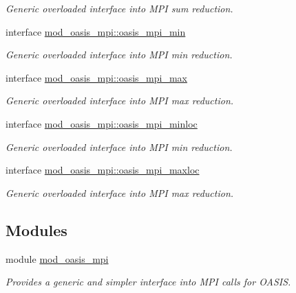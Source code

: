 \begin{DoxyCompactItemize}
\begin{DoxyCompactList}\small\item\em Generic overloaded interface into M\+PI sum reduction. \end{DoxyCompactList}\item 
interface \hyperlink{interfacemod__oasis__mpi_1_1oasis__mpi__min}{mod\+\_\+oasis\+\_\+mpi\+::oasis\+\_\+mpi\+\_\+min}
\begin{DoxyCompactList}\small\item\em Generic overloaded interface into M\+PI min reduction. \end{DoxyCompactList}\item 
interface \hyperlink{interfacemod__oasis__mpi_1_1oasis__mpi__max}{mod\+\_\+oasis\+\_\+mpi\+::oasis\+\_\+mpi\+\_\+max}
\begin{DoxyCompactList}\small\item\em Generic overloaded interface into M\+PI max reduction. \end{DoxyCompactList}\item 
interface \hyperlink{interfacemod__oasis__mpi_1_1oasis__mpi__minloc}{mod\+\_\+oasis\+\_\+mpi\+::oasis\+\_\+mpi\+\_\+minloc}
\begin{DoxyCompactList}\small\item\em Generic overloaded interface into M\+PI min reduction. \end{DoxyCompactList}\item 
interface \hyperlink{interfacemod__oasis__mpi_1_1oasis__mpi__maxloc}{mod\+\_\+oasis\+\_\+mpi\+::oasis\+\_\+mpi\+\_\+maxloc}
\begin{DoxyCompactList}\small\item\em Generic overloaded interface into M\+PI max reduction. \end{DoxyCompactList}\end{DoxyCompactItemize}
\subsection*{Modules}
\begin{DoxyCompactItemize}
\item 
module \hyperlink{namespacemod__oasis__mpi}{mod\+\_\+oasis\+\_\+mpi}
\begin{DoxyCompactList}\small\item\em Provides a generic and simpler interface into M\+PI calls for O\+A\+S\+IS. \end{DoxyCompactList}\end{DoxyCompactItemize}
